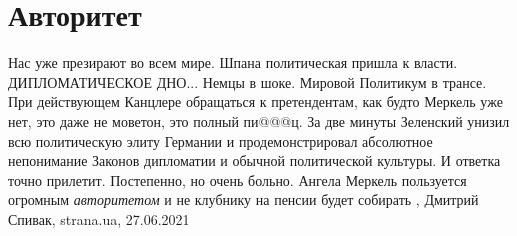  
 
 
 
 
\chapter{Авторитет}

Нас уже презирают во всем мире. Шпана политическая пришла к власти.
ДИПЛОМАТИЧЕСКОЕ ДНО...  Немцы в шоке. Мировой Политикум в трансе. При
действующем Канцлере обращаться к претендентам, как будто Меркель уже нет, это
даже не моветон, это полный пи@@@ц.  За две минуты Зеленский унизил всю
политическую элиту Германии и продемонстрировал абсолютное непонимание Законов
дипломатии и обычной политической культуры.  И ответка точно прилетит.
Постепенно, но очень больно. Ангела Меркель пользуется огромным
\emph{авторитетом} и не клубнику на пенсии будет собирать
, 
Дмитрий Спивак, strana.ua, 27.06.2021
